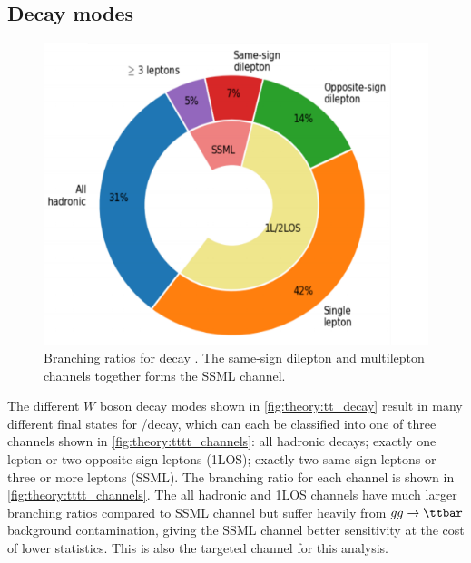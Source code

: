 \documentclass[../thesis.tex]{subfiles}
\begin{document}
\subsection*{Decay modes}
\begin{figure}
\begin{center}
\includegraphics[width=\linewidth]{fig/theory_tttt_channels.png}
\caption[Branching ratios for \tttt decay. The same-sign dilepton and multilepton channels together forms the SSML channel.]{\label{fig:theory:tttt_channels}Branching ratios for \tttt decay \citep{Sabatini:2784150}. The same-sign dilepton and multilepton channels together forms the \acs{SSML} channel.}
\end{center}
\end{figure}
The different $W$ boson decay modes shown in \autoref{fig:theory:tt_decay} result in many different final states for \ttZp/\tttt decay, which can each be classified into one of three channels shown in \autoref{fig:theory:tttt_channels}: all hadronic decays; exactly one lepton or two opposite-sign leptons (\acs{1LOS}); exactly two same-sign leptons or three or more leptons (\acs{SSML}). The branching ratio for each channel is shown in \autoref{fig:theory:tttt_channels}. The all hadronic and \acs{1LOS} channels have much larger branching ratios compared to \acs{SSML} channel but suffer heavily from $gg\rightarrow\ttbar$ background contamination, giving the \acs{SSML} channel better sensitivity at the cost of lower statistics. This is also the targeted channel for this analysis.
\end{document}
